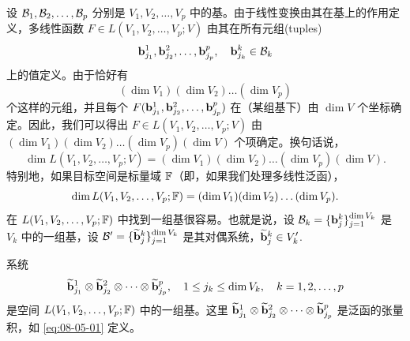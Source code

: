 设 $\mathcal{B}_1, \mathcal{B}_2, \dots, \mathcal{B}_p$ 分别是 $V_1, V_2, \dots, V_p$ 中的基。由于线性变换由其在基上的作用定义，多线性函数 $F \in L(V_1, V_2, \dots, V_p; V)$ 由其在所有元组(tuples)
$$\mathbf{b}^{1}_{j_1}, \mathbf{b}^{2}_{j_2}, \dots, \mathbf{b}^{p}_{j_p},\quad \mathbf{b}^{k}_{j_k} \in \mathcal{B}_k$$
上的值定义。由于恰好有
$$(\dim V_1)(\dim V_2) \dots (\dim V_p)$$
个这样的元组，并且每个 $F(\mathbf{b}^{1}_{j_1}, \mathbf{b}^{2}_{j_2}, \dots, \mathbf{b}^{p}_{j_p})$ 在（某组基下）由 $\dim V$ 个坐标确定。因此，我们可以得出 $F \in L(V_1, V_2, \dots, V_p; V)$ 由 $(\dim V_1)(\dim V_2) \dots (\dim V_p)(\dim V)$ 个项确定。换句话说，
$$ \dim L(V_1, V_2, \dots, V_p; V) = (\dim V_1)(\dim V_2) \dots (\dim V_p)(\dim V). $$
特别地，如果目标空间是标量域 $\mathbb{F}$（即，如果我们处理多线性泛函），
$$ \dim L(V_1, V_2, \dots, V_p; \mathbb{F}) = (\dim V_1)(\dim V_2) \dots (\dim V_p). $$
在 $L(V_1, V_2, \dots, V_p; \mathbb{F})$ 中找到一组基很容易。也就是说，设 $\mathcal{B}_k = \{\mathbf{b}_{j}^{k}\}_{j=1}^{\dim V_k}$ 是 $V_k$ 中的一组基，设 $\mathcal{B}' = \{\widetilde{\mathbf{b}}_{j}^{k}\}_{j=1}^{\dim V_k}$ 是其对偶系统，$\widetilde{\mathbf{b}}_{j}^{k} \in V'_k$.~

\begin{proposition}\label{stmt:08-05-02}
系统 $$\widetilde{\mathbf{b}}^{1}_{j_1} \otimes \widetilde{\mathbf{b}}^{2}_{j_2} \otimes \dots \otimes \widetilde{\mathbf{b}}^{p}_{j_p},\quad 1 \le j_k \le \dim V_k,\quad k = 1, 2, \dots, p$$
是空间 $L(V_1, V_2, \dots, V_p; \mathbb{F})$ 中的一组基。这里 $\widetilde{\mathbf{b}}^{1}_{j_1} \otimes \widetilde{\mathbf{b}}^{2}_{j_2} \otimes \dots \otimes \widetilde{\mathbf{b}}^{p}_{j_p}$ 是泛函的张量积，如 \eqref{eq:08-05-01} 定义。
\end{proposition}


